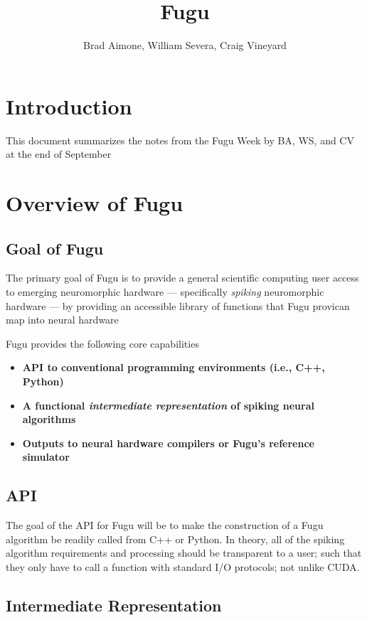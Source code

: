 \documentclass{article}
\begin{document}
\title{Fugu}
\author{Brad Aimone, William Severa, Craig Vineyard}

\maketitle


\section{Introduction}

This document summarizes the notes from the Fugu Week by BA, WS, and CV at the end of September

\section{Overview of Fugu}

\subsection{Goal of Fugu}
The primary goal of Fugu is to provide a general scientific computing user access to emerging neuromorphic hardware --- specifically \textit{spiking} neuromorphic hardware --- by providing an accessible library of functions that Fugu provican map into neural hardware

Fugu provides the following core capabilities 
\begin{itemize}
\item \textbf{API to conventional programming environments (i.e., C++, Python)} 
\item \textbf{A functional \textit{intermediate representation} of spiking neural algorithms}
\item \textbf{Outputs to neural hardware compilers or Fugu's reference simulator}
\end{itemize}

\subsection{API}

The goal of the API for Fugu will be to make the construction of a Fugu algorithm be readily called from C++ or Python.  In theory, all of the spiking algorithm requirements and processing should be transparent to a user; such that they only have to call a function with standard I/O protocols; not unlike CUDA.


\subsection{Intermediate Representation}
\end{document}
